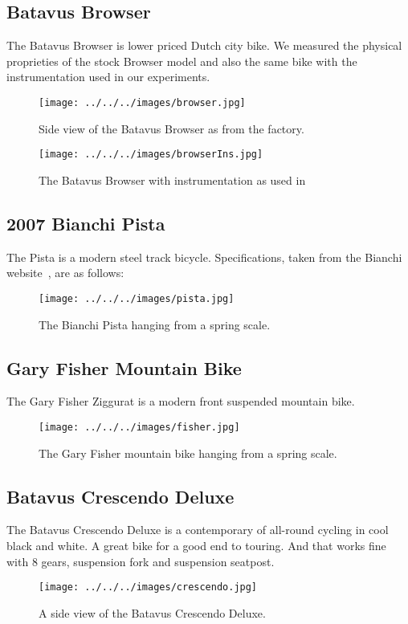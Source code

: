\documentclass{bmd2010p}
\begin{document}
\subsection{Batavus Browser}
The Batavus Browser is lower priced Dutch city bike. We measured the physical
proprieties of the stock Browser model and also the same bike with the
instrumentation used in our experiments.
\begin{figure}[htbp]
    \begin{center}
        \texttt{[image: ../../../images/browser.jpg]}
    \end{center}
    \caption{Side view of the Batavus Browser as from the factory.}
    \label{fig:browser}
\end{figure}
\begin{figure}[htbp]
    \begin{center}
        \texttt{[image: ../../../images/browserIns.jpg]}
    \end{center}
    \caption{The Batavus Browser with instrumentation as used
    in~\cite{Kooijman2009}}
    \label{fig:browserIns}
\end{figure}

\subsection{2007 Bianchi Pista}
The Pista is a modern steel track bicycle. Specifications, taken from the Bianchi
website~\cite{Bianchi2009}, are as follows:
\begin{figure}[htbp]
    \begin{center}
        \texttt{[image: ../../../images/pista.jpg]}
    \end{center}
    \caption{The Bianchi Pista hanging from a spring scale.}
    \label{fig:pista}
\end{figure}
\subsection{Gary Fisher Mountain Bike}
The Gary Fisher Ziggurat is a modern front suspended mountain bike.
\begin{figure}[htbp]
    \begin{center}
        \texttt{[image: ../../../images/fisher.jpg]}
    \end{center}
    \caption{The Gary Fisher mountain bike hanging from a spring scale.}
    \label{fig:fisher}
\end{figure}
\subsection{Batavus Crescendo Deluxe}
The Batavus Crescendo Deluxe is a contemporary of all-round cycling in cool
black and white. A great bike for a good end to touring. And that works fine
with 8 gears, suspension fork and suspension seatpost.
\begin{figure}[htbp]
    \begin{center}
        \texttt{[image: ../../../images/crescendo.jpg]}
    \end{center}
    \caption{A side view of the Batavus Crescendo Deluxe.}
    \label{fig:crescendo}
\end{figure}
\end{document}

